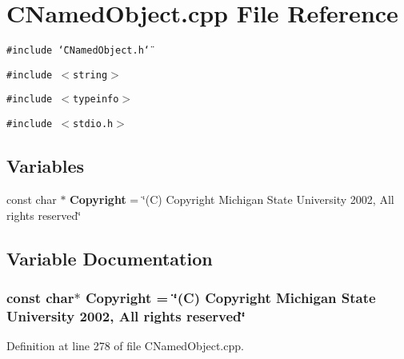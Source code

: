 \section{CNamed\-Object.cpp File Reference}
\label{CNamedObject_8cpp}
{\tt \#include \char`\"{}CNamed\-Object.h\char`\"{}}\par
{\tt \#include $<$string$>$}\par
{\tt \#include $<$typeinfo$>$}\par
{\tt \#include $<$stdio.h$>$}\par
\subsection*{Variables}
\begin{CompactItemize}
\item 
const char $\ast$ {\bf Copyright} = \char`\"{}(C) Copyright Michigan State University 2002, All rights reserved\char`\"{}
\end{CompactItemize}


\subsection{Variable Documentation}
\subsubsection{\setlength{\rightskip}{0pt plus 5cm}const char$\ast$ Copyright = \char`\"{}(C) Copyright Michigan State University 2002, All rights reserved\char`\"{}\hspace{0.3cm}{\tt  [static]}}\label{CNamedObject_8cpp_a0}




Definition at line 278 of file CNamed\-Object.cpp.